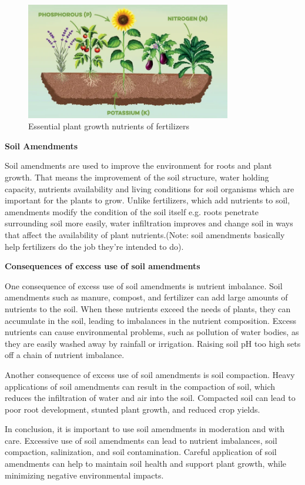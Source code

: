 \documentclass{article}
\begin{document}
{                \begin{figure}[h]
                    \centering
                    \includegraphics[width=0.8\textwidth]{Figures/fertilizer.png}
                    \caption{Essential plant growth nutrients of fertilizers}
                    \label{fig:my_label}
                \end{figure}
                
                \newpage
                \textbf{Soil Amendments}\par 
                Soil amendments are used to improve the environment for roots and plant growth. That means the improvement of the soil structure, water holding capacity, nutrients availability and living conditions for soil organisms which are important for the plants to grow. Unlike fertilizers, which add nutrients to soil, amendments modify the condition of the soil itself e.g. roots penetrate surrounding soil more easily, water infiltration improves and change soil in ways that affect the availability of plant nutrients.(Note: soil amendments basically help fertilizers do the job they’re intended to do).
                
                \textbf{Consequences of excess use of soil amendments }\par 
                One consequence of excess use of soil amendments is nutrient imbalance. Soil amendments such as manure, compost, and fertilizer can add large amounts of nutrients to the soil. When these nutrients exceed the needs of plants, they can accumulate in the soil, leading to imbalances in the nutrient composition. Excess nutrients can cause environmental problems, such as pollution of water bodies, as they are easily washed away by rainfall or irrigation. Raising soil pH too high sets off a chain of nutrient imbalance.\par
                Another consequence of excess use of soil amendments is soil compaction. Heavy applications of soil amendments can result in the compaction of soil, which reduces the infiltration of water and air into the soil. Compacted soil can lead to poor root development, stunted plant growth, and reduced crop yields.\par
                In conclusion, it is important to use soil amendments in moderation and with care. Excessive use of soil amendments can lead to nutrient imbalances, soil compaction, salinization, and soil contamination. Careful application of soil amendments can help to maintain soil health and support plant growth, while minimizing negative environmental impacts.
                
}
\end{document}
